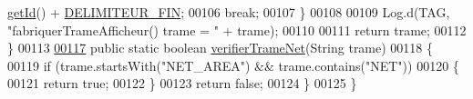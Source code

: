 \begin{DoxyCode}
      \hyperlink{classcom_1_1example_1_1area_1_1_partie_a535a67141814a238c1ffc0c42d0afedc}{getId}() + \hyperlink{classcom_1_1example_1_1area_1_1_protocol_a_r_e_a_a77f13634749dc65bc24d98672ff7ba03}{DELIMITEUR\_FIN};
00106                 \textcolor{keywordflow}{break};
00107         \}
00108 
00109         Log.d(TAG, \textcolor{stringliteral}{"fabriquerTrameAfficheur() trame = "} + trame);
00110 
00111         \textcolor{keywordflow}{return} trame;
00112     \}
00113 
\hyperlink{classcom_1_1example_1_1area_1_1_protocol_a_r_e_a_af675efbe6d33699aa34c01f6223fa711}{00117}     \textcolor{keyword}{public} \textcolor{keyword}{static} \textcolor{keywordtype}{boolean} \hyperlink{classcom_1_1example_1_1area_1_1_protocol_a_r_e_a_af675efbe6d33699aa34c01f6223fa711}{verifierTrameNet}(String trame)
00118     \{
00119         \textcolor{keywordflow}{if} (trame.startsWith(\textcolor{stringliteral}{"NET\_AREA"}) && trame.contains(\textcolor{stringliteral}{"NET"}))
00120         \{
00121             \textcolor{keywordflow}{return} \textcolor{keyword}{true};
00122         \}
00123         \textcolor{keywordflow}{return} \textcolor{keyword}{false};
00124     \}
00125 \}
\end{DoxyCode}
